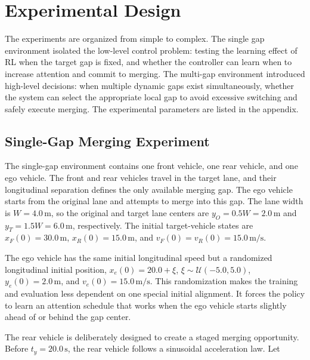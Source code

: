 \section{Experimental Design}





The experiments are organized from simple to complex. The single gap environment isolated the low-level control problem: testing the learning effect of RL when the target gap is fixed, and whether the controller can learn when to increase attention and commit to merging. The multi-gap environment introduced high-level decisions: when multiple dynamic gaps exist simultaneously, whether the system can select the appropriate local gap to avoid excessive switching and safely execute merging. The experimental parameters are listed in the appendix.



\subsection{Single-Gap Merging Experiment}





The single-gap environment contains one front vehicle, one rear vehicle, and one ego vehicle. The front and rear vehicles travel in the target lane, and their longitudinal separation defines the only available merging gap. The ego vehicle starts from the original lane and attempts to merge into this gap. The lane width is \(W=4.0\,\mathrm{m}\), so the original and target lane centers are \(y_O=0.5W=2.0\,\mathrm{m}\) and \(y_T=1.5W=6.0\,\mathrm{m}\), respectively. The initial target-vehicle states are \(x_F(0)=30.0\,\mathrm{m}\), \(x_R(0)=15.0\,\mathrm{m}\), and \(v_F(0)=v_R(0)=15.0\,\mathrm{m/s}\).





The ego vehicle has the same initial longitudinal speed but a randomized longitudinal initial position, \(x_e(0)=20.0+\xi\), \(\xi\sim\mathcal{U}(-5.0,5.0)\), \(y_e(0)=2.0\,\mathrm{m}\), and \(v_e(0)=15.0\,\mathrm{m/s}\). This randomization makes the training and evaluation less dependent on one special initial alignment. It forces the policy to learn an attention schedule that works when the ego vehicle starts slightly ahead of or behind the gap center.





The rear vehicle is deliberately designed to create a staged merging opportunity. Before \(t_y=20.0\,\mathrm{s}\), the rear vehicle follows a sinusoidal acceleration law. Let



